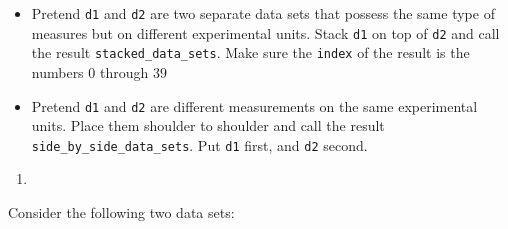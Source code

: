 \documentclass[
  12pt,
  krantz2]{krantz}
\providecommand{\tightlist}{%
  \setlength{\itemsep}{0pt}\setlength{\parskip}{0pt}}
\begin{document}
\begin{itemize}
\tightlist
\item
  Pretend \texttt{d1} and \texttt{d2} are two separate data sets that possess the same type of measures but on different experimental units. Stack \texttt{d1} on top of \texttt{d2} and call the result \texttt{stacked\_data\_sets}. Make sure the \texttt{index} of the result is the numbers \(0\) through \(39\)
\item
  Pretend \texttt{d1} and \texttt{d2} are different measurements on the same experimental units. Place them shoulder to shoulder and call the result \texttt{side\_by\_side\_data\_sets}. Put \texttt{d1} first, and \texttt{d2} second.
\end{itemize}

\begin{enumerate}
\def\labelenumi{\arabic{enumi}.}
\setcounter{enumi}{2}
\tightlist
\item
\end{enumerate}

Consider the following two data sets:
\end{document}

